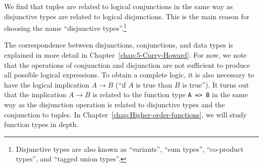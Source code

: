 We find that tuples are related to logical conjunctions in the same
way as disjunctive types are related to logical disjunctions. This
is the main reason for choosing the name ``disjunctive types''.\footnote{Disjunctive types are also known as ``variants'', ``sum types'',
``co-product types'', and ``tagged union types''.}

The correspondence between disjunctions, conjunctions, and data types
is explained in more detail in Chapter~\ref{chap:5-Curry-Howard}.
For now, we note that the operations of conjunction and disjunction
are not sufficient to produce all possible logical expressions. To
obtain a complete logic, it is also necessary to have the logical
implication $A\rightarrow B$ (``if $A$ is true than $B$ is true'').
It turns out that the implication $A\rightarrow B$ is related to
the function type \lstinline!A => B! in the same way as the disjunction
operation is related to disjunctive types and the conjunction to tuples.
In Chapter~\ref{chap:Higher-order-functions}, we will study function
types in depth.

